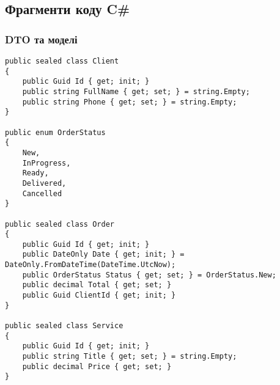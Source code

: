 \documentclass[14pt,a4paper]{extarticle}
\begin{document}
\subsection{Фрагменти коду C\#}
\subsubsection*{DTO та моделі}
\begin{lstlisting}[language=CSharp,caption={Моделі домену для ательє}]
public sealed class Client
{
    public Guid Id { get; init; }
    public string FullName { get; set; } = string.Empty;
    public string Phone { get; set; } = string.Empty;
}

public enum OrderStatus
{
    New,
    InProgress,
    Ready,
    Delivered,
    Cancelled
}

public sealed class Order
{
    public Guid Id { get; init; }
    public DateOnly Date { get; init; } = DateOnly.FromDateTime(DateTime.UtcNow);
    public OrderStatus Status { get; set; } = OrderStatus.New;
    public decimal Total { get; set; }
    public Guid ClientId { get; init; }
}

public sealed class Service
{
    public Guid Id { get; init; }
    public string Title { get; set; } = string.Empty;
    public decimal Price { get; set; }
}
\end{lstlisting}
\end{document}
